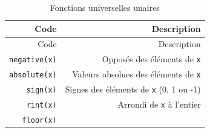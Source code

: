 \documentclass[12pt,]{book}
\numberwithin{equation}{section}
\numberwithin{countremarque}{section}
\begin{document}
\begin{longtable}[]{@{}rr@{}}
\caption{\label{tab:ufuncs-unaires} Fonctions universelles
unaires}\tabularnewline
\toprule
\begin{minipage}[b]{0.18\columnwidth}\raggedleft\strut
Code\strut
\end{minipage} & \begin{minipage}[b]{0.71\columnwidth}\raggedleft\strut
Description\strut
\end{minipage}\tabularnewline
\midrule
\endfirsthead
\toprule
\begin{minipage}[b]{0.18\columnwidth}\raggedleft\strut
Code\strut
\end{minipage} & \begin{minipage}[b]{0.71\columnwidth}\raggedleft\strut
Description\strut
\end{minipage}\tabularnewline
\midrule
\endhead
\begin{minipage}[t]{0.18\columnwidth}\raggedleft\strut
\texttt{negative(x)}\strut
\end{minipage} & \begin{minipage}[t]{0.71\columnwidth}\raggedleft\strut
Opposés des éléments de \texttt{x}\strut
\end{minipage}\tabularnewline
\begin{minipage}[t]{0.18\columnwidth}\raggedleft\strut
\texttt{absolute(x)}\strut
\end{minipage} & \begin{minipage}[t]{0.71\columnwidth}\raggedleft\strut
Valeurs absolues des éléments de \texttt{x}\strut
\end{minipage}\tabularnewline
\begin{minipage}[t]{0.18\columnwidth}\raggedleft\strut
\texttt{sign(x)}\strut
\end{minipage} & \begin{minipage}[t]{0.71\columnwidth}\raggedleft\strut
Signes des éléments de \texttt{x} (0, 1 ou -1)\strut
\end{minipage}\tabularnewline
\begin{minipage}[t]{0.18\columnwidth}\raggedleft\strut
\texttt{rint(x)}\strut
\end{minipage} & \begin{minipage}[t]{0.71\columnwidth}\raggedleft\strut
Arrondi de \texttt{x} à l'entier\strut
\end{minipage}\tabularnewline
\begin{minipage}[t]{0.18\columnwidth}\raggedleft\strut
\texttt{floor(x)}\strut
\end{minipage} & \begin{minipage}[t]{0.71\columnwidth}\raggedleft\strut

\end{minipage}
\end{longtable}
\end{document}
